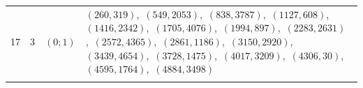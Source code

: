 \documentclass[11pt]{article}
\begin{document}
\begin{longtable}{@{}rrl>{\raggedright\arraybackslash}p{}@{}}
17 & 3 & $(0;1)$ & $(260,319)$,\allowbreak\ $(549,2053)$,\allowbreak\ $(838,3787)$,\allowbreak\ $(1127,608)$,\allowbreak\ $(1416,2342)$,\allowbreak\ $(1705,4076)$,\allowbreak\ $(1994,897)$,\allowbreak\ $(2283,2631)$,\allowbreak\ $(2572,4365)$,\allowbreak\ $(2861,1186)$,\allowbreak\ $(3150,2920)$,\allowbreak\ $(3439,4654)$,\allowbreak\ $(3728,1475)$,\allowbreak\ $(4017,3209)$,\allowbreak\ $(4306,30)$,\allowbreak\ $(4595,1764)$,\allowbreak\ $(4884,3498)$\\
\addlinespace[3pt]
\end{longtable}
\endgroup
\end{document}
